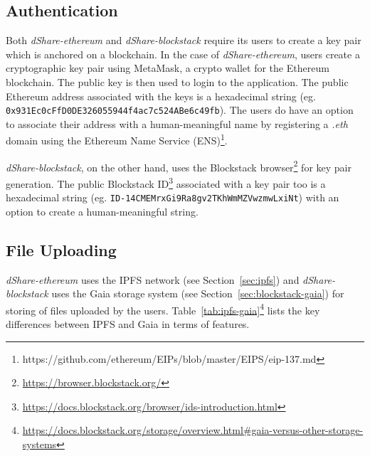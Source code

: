 			\subsection{Authentication}
			Both \textit{dShare-ethereum} and \textit{dShare-blockstack} require its users to create a key pair which is anchored on a blockchain. In the case of \textit{dShare-ethereum}, users create a cryptographic key pair using MetaMask, a crypto wallet for the Ethereum blockchain. The public key is then used to login to the application. The public Ethereum address associated with the keys is a hexadecimal string (eg. \texttt{0x931Ec0cFfD0DE326055944f4ac7c524ABe6c49fb}). The users do have an option to associate their address with a human-meaningful name by registering a \textit{.eth} domain using the Ethereum Name Service (ENS)\footnote{https://github.com/ethereum/EIPs/blob/master/EIPS/eip-137.md}.
			
			\textit{dShare-blockstack}, on the other hand, uses the Blockstack browser\footnote{\url{https://browser.blockstack.org/}} for key pair generation. The public Blockstack ID\footnote{\url{https://docs.blockstack.org/browser/ids-introduction.html}} associated with a key pair too is a hexadecimal string (eg. \texttt{ID-14CMEMrxGi9Ra8gv2TKhWmMZVwzmwLxiNt}) with an option to create a human-meaningful string.
			
			\subsection{File Uploading}
			\textit{dShare-ethereum} uses the IPFS\cite{benet2014ipfs} network (see Section~\ref{sec:ipfs}) and \textit{dShare-blockstack} uses the Gaia storage system (see Section~\ref{sec:blockstack-gaia}) for storing of files uploaded by the users. Table~\ref{tab:ipfs-gaia}\footnote{\url{https://docs.blockstack.org/storage/overview.html\#gaia-versus-other-storage-systems}} lists the key differences between IPFS and Gaia in terms of features.
		
